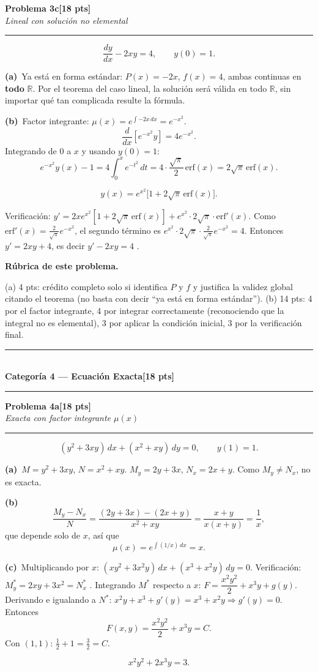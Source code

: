 \documentclass[11pt,letterpaper]{article}
\newcommand{\categoria}[3]{%
  \bigskip\bigskip\noindent
  \rule{\linewidth}{0.8pt}\\[2pt]
  {\Large\bfseries Categoría #1 --- #2}\hfill\textbf{[#3 pts]}\\[2pt]
  \rule{\linewidth}{0.8pt}\vspace{4pt}
}
\newcommand{\problema}[3]{%
  \bigskip\noindent
  {\large\textbf{Problema #1}}\hfill\textbf{[#2 pts]}\\[3pt]
  {\small\itshape #3}\par
  \vspace{2pt}\hrule\vspace{8pt}
}
\newcommand{\subparte}[2]{%
  \medskip\noindent\textbf{(#1}\ #2\par\smallskip
}
\newenvironment{resultado}
  {\begin{mdframed}[linecolor=black,linewidth=0.6pt,
    innerleftmargin=6pt,innerrightmargin=6pt,innertopmargin=4pt,innerbottommargin=4pt]
   \bfseries}
  {\end{mdframed}}
\newenvironment{rubrica}{%
  \begin{mdframed}[linecolor=black,linewidth=0.6pt,
    innerleftmargin=8pt,innerrightmargin=8pt,innertopmargin=5pt,innerbottommargin=5pt]
  \small\textbf{Rúbrica de este problema.}\par\smallskip
}{\end{mdframed}}
\begin{document}
\newpage
\problema{3c}{18}{Lineal con solución no elemental}

\[
\frac{dy}{dx}-2xy=4, \qquad y(0)=1.
\]

\subparte{a)}{Ya está en forma estándar: $P(x)=-2x$, $f(x)=4$, ambas continuas en \textbf{todo} $\mathbb{R}$. Por el teorema del caso lineal, la solución será válida en todo $\mathbb{R}$, sin importar qué tan complicada resulte la fórmula.}

\subparte{b)}{Factor integrante: $\mu(x)=e^{\int -2x\,dx}=e^{-x^2}$.
\[
\frac{d}{dx}\left[e^{-x^2}y\right] = 4e^{-x^2}.
\]
Integrando de $0$ a $x$ y usando $y(0)=1$:
\[
e^{-x^2}y(x) - 1 = 4\int_0^x e^{-t^2}\,dt = 4\cdot\frac{\sqrt\pi}{2}\,\text{erf}(x) = 2\sqrt\pi\,\text{erf}(x).
\]
\begin{resultado}
\[
y(x) = e^{x^2}\Big[1+2\sqrt\pi\,\text{erf}(x)\Big].
\]
\end{resultado}
Verificación: $y'=2xe^{x^2}[1+2\sqrt\pi\,\text{erf}(x)] + e^{x^2}\cdot2\sqrt\pi\cdot\text{erf}'(x)$. Como $\text{erf}'(x)=\frac{2}{\sqrt\pi}e^{-x^2}$, el segundo término es $e^{x^2}\cdot2\sqrt\pi\cdot\frac{2}{\sqrt\pi}e^{-x^2}=4$. Entonces $y'=2xy+4$, es decir $y'-2xy=4$ \checkmark.}

\begin{rubrica}
(a) 4 pts: crédito completo solo si identifica $P$ y $f$ y justifica la validez global citando el teorema (no basta con decir ``ya está en forma estándar''). (b) 14 pts: 4 por el factor integrante, 4 por integrar correctamente (reconociendo que la integral no es elemental), 3 por aplicar la condición inicial, 3 por la verificación final.
\end{rubrica}

\newpage
\categoria{4}{Ecuación Exacta}{18}

\problema{4a}{18}{Exacta con factor integrante $\mu(x)$}

\[
(y^2+3xy)\,dx+(x^2+xy)\,dy=0, \qquad y(1)=1.
\]

\subparte{a)}{$M=y^2+3xy$, $N=x^2+xy$. $M_y=2y+3x$, $N_x=2x+y$. Como $M_y\neq N_x$, no es exacta.}

\subparte{b)}{
\[
\frac{M_y-N_x}{N} = \frac{(2y+3x)-(2x+y)}{x^2+xy} = \frac{x+y}{x(x+y)} = \frac1x,
\]
que depende solo de $x$, así que
\[
\mu(x) = e^{\int (1/x)\,dx} = x.
\]}

\subparte{c)}{Multiplicando por $x$: $(xy^2+3x^2y)\,dx+(x^3+x^2y)\,dy=0$. Verificación: $M^*_y=2xy+3x^2=N^*_x$ \checkmark. Integrando $M^*$ respecto a $x$: $F=\dfrac{x^2y^2}{2}+x^3y+g(y)$. Derivando e igualando a $N^*$: $x^2y+x^3+g'(y)=x^3+x^2y \Rightarrow g'(y)=0$. Entonces
\[
F(x,y) = \frac{x^2y^2}{2}+x^3y = C.
\]
Con $(1,1)$: $\frac12+1=\frac32=C$.
\begin{resultado}
\[
x^2y^2+2x^3y = 3.
\]
\end{resultado}}
\end{document}
